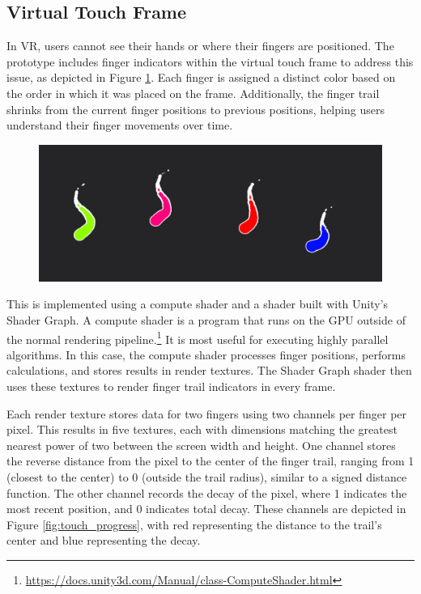    \subsection{Virtual Touch Frame} \label{sec:touch_frame}

        In VR, users cannot see their hands or where their fingers are positioned. The prototype includes finger indicators within the virtual touch frame to address this issue, as depicted in Figure \ref{fig:touch_indicators}. Each finger is assigned a distinct color based on the order in which it was placed on the frame. Additionally, the finger trail shrinks from the current finger positions to previous positions, helping users understand their finger movements over time.
      
        \begin{figure}[h!]
            \centering
            \includegraphics[width=1\textwidth]{figures/touch_indicators.png}
            \label{fig:touch_indicators}
        \end{figure}

        This is implemented using a compute shader and a shader built with Unity's Shader Graph. A compute shader is a program that runs on the GPU outside of the normal rendering pipeline.\footnote{\url{https://docs.unity3d.com/Manual/class-ComputeShader.html}} It is most useful for executing highly parallel algorithms. In this case, the compute shader processes finger positions, performs calculations, and stores results in render textures. The Shader Graph shader then uses these textures to render finger trail indicators in every frame.

        Each render texture stores data for two fingers using two channels per finger per pixel. This results in five textures, each with dimensions matching the greatest nearest power of two between the screen width and height. One channel stores the reverse distance from the pixel to the center of the finger trail, ranging from 1 (closest to the center) to 0 (outside the trail radius), similar to a signed distance function. The other channel records the decay of the pixel, where 1 indicates the most recent position, and 0 indicates total decay. These channels are depicted in Figure \ref{fig:touch_progress}, with red representing the distance to the trail's center and blue representing the decay.
        
